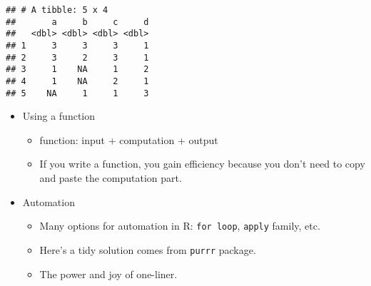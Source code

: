 \documentclass[
]{book}
\newenvironment{Shaded}{\begin{snugshade}}{\end{snugshade}}
\newcommand{\CommentTok}[1]{\textcolor[rgb]{0.56,0.35,0.01}{\textit{#1}}}
\newcommand{\ControlFlowTok}[1]{\textcolor[rgb]{0.13,0.29,0.53}{\textbf{#1}}}
\newcommand{\DecValTok}[1]{\textcolor[rgb]{0.00,0.00,0.81}{#1}}
\newcommand{\KeywordTok}[1]{\textcolor[rgb]{0.13,0.29,0.53}{\textbf{#1}}}
\newcommand{\NormalTok}[1]{#1}
\newcommand{\OperatorTok}[1]{\textcolor[rgb]{0.81,0.36,0.00}{\textbf{#1}}}
\newcommand{\OtherTok}[1]{\textcolor[rgb]{0.56,0.35,0.01}{#1}}
\newcommand{\StringTok}[1]{\textcolor[rgb]{0.31,0.60,0.02}{#1}}
\providecommand{\tightlist}{%
  \setlength{\itemsep}{0pt}\setlength{\parskip}{0pt}}
\begin{document}
\begin{verbatim}
## # A tibble: 5 x 4
##       a     b     c     d
##   <dbl> <dbl> <dbl> <dbl>
## 1     3     3     3     1
## 2     3     2     3     1
## 3     1    NA     1     2
## 4     1    NA     2     1
## 5    NA     1     1     3
\end{verbatim}

\begin{itemize}
\tightlist
\item
  Using a function

  \begin{itemize}
  \tightlist
  \item
    function: input + computation + output
  \item
    If you write a function, you gain efficiency because you don't need to copy and paste the computation part.
  \end{itemize}
\end{itemize}

\begin{Shaded}
\end{Shaded}

\begin{itemize}
\tightlist
\item
  Automation

  \begin{itemize}
  \tightlist
  \item
    Many options for automation in R: \texttt{for\ loop}, \texttt{apply} family, etc.
  \item
    Here's a tidy solution comes from \texttt{purrr} package.
  \item
    The power and joy of one-liner.
  \end{itemize}
\end{itemize}
\end{document}
